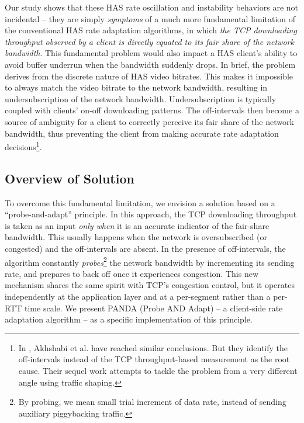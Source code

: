 \documentclass[conference]{IEEEtran}
\theoremstyle{plain}
\theoremstyle{definition}
\theoremstyle{plain}
\theoremstyle{plain}
\begin{document}
Our study shows that these HAS rate oscillation and instability behaviors
are not incidental -- they are simply \emph{symptoms} of a much more
fundamental limitation of the conventional HAS rate adaptation algorithms,
in which \emph{the TCP downloading throughput observed by a client
is directly equated to its fair share of the network bandwidth}. This
fundamental problem would also impact a HAS client's ability to avoid
buffer underrun when the bandwidth suddenly drops. In brief, the problem
derives from the discrete nature of HAS video bitrates. This makes
it impossible to always match the video bitrate to the network bandwidth,
resulting in undersubscription of the network bandwidth. Undersubscription
is typically coupled with clients' on-off downloading patterns. The
off-intervals then become a source of ambiguity for a client to correctly
perceive its fair share of the network bandwidth, thus preventing
the client from making accurate rate adaptation decisions\footnote{In \cite{Akhshabi:NOSSDAV12}, Akhshabi et al. have reached similar
conclusions. But they identify the off-intervals instead of the TCP
throughput-based measurement as the root cause. Their sequel work
\cite{Akhshabi:NOSSDAV13} attempts to tackle the problem from a very
different angle using traffic shaping.}.

\vspace{-0.07in}


\subsection{Overview of Solution}

To overcome this fundamental limitation, we envision a solution based
on a ``probe-and-adapt'' principle. In this approach, the TCP downloading
throughput is taken as an input \emph{only when} it is an accurate
indicator of the fair-share bandwidth. This usually happens when the
network is oversubscribed (or congested) and the off-intervals are
absent. In the presence of off-intervals, the algorithm constantly
\emph{probes}\footnote{By probing, we mean small trial increment of data rate, instead of
sending auxiliary piggybacking traffic.} the network bandwidth by incrementing its sending rate, and prepares
to back off once it experiences congestion. This new mechanism shares
the same spirit with TCP's congestion control, but it operates independently
at the application layer and at a per-segment rather than a per-RTT
time scale. We present PANDA (Probe AND Adapt) -- a client-side rate
adaptation algorithm -- as a specific implementation of this principle.
\end{document}

